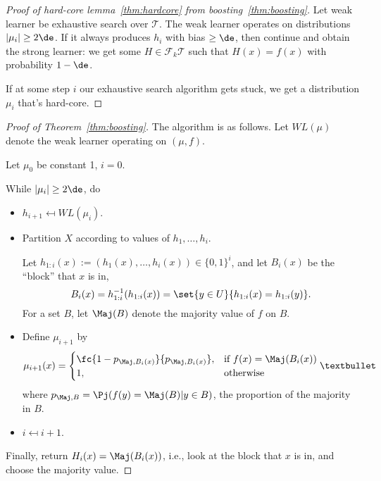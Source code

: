 \begin{proof}[Proof of hard-core lemma~\ref{thm:hardcore} from boosting~\ref{thm:boosting}]
Let weak learner be exhaustive search over $\mathcal T$. The weak learner operates on distributions $|\mu_i|\ge 2\de$. If it always produces $h_i$ with bias $\ge \de$, then continue  and obtain the strong learner: we get some $H\in \mathcal F_k \mathcal T$ such that  $H(x)=f(x)$ with probability $1-\de$. 

If at some step $i$ our exhaustive search algorithm gets stuck, we get a distribution $\mu_i$ that's hard-core.
\end{proof}

\begin{proof}[Proof of Theorem~\ref{thm:boosting}]

The algorithm is as follows. Let $WL(\mu)$ denote the weak learner operating on $(\mu, f)$.

Let $\mu_0$ be constant 1, $i=0$.

While $|\mu_i|\ge 2\de$, do
\begin{itemize}
\item
$h_{i+1}\mapsfrom WL(\mu_i)$.
\item
Partition $X$ according to values of $h_1,\ldots,h_i$.

Let $h_{1:i}(x):= (h_1(x),\ldots, h_i(x))\in \{0,1\}^i$, and let $B_i(x)$ be the ``block'' that $x$ is in, 
$$B_i(x) = h_{1:i}^{-1}(h_{1:i}(x)) = \set{y\in U}{h_{1:i}(x)=h_{1:i}(y)}.$$ 
For a set $B$, let $\Maj(B)$ denote the majority value of $f$ on $B$. 
\item
Define $\mu_{i+1}$ by 
%
$$\mu_{i+1}(x) = \begin{cases}
\fc{1-p_{\Maj, B_i(x)}}{p_{\Maj, B_i(x)}},&\text{if } f(x)=\Maj(B_i(x))\\
1,&\text{otherwise}
\end{cases}• $$
where $p_{\Maj,B} = \Pj(f(y) = \Maj(B)| y\in B)$, the proportion of the majority in $B$.
\item
$i\mapsfrom i+1$.
\end{itemize}
Finally, return $H_{i}(x) = \Maj({B_{i}(x)})$, i.e., look at the block that $x$ is in, and choose the majority value.


\end{proof}
